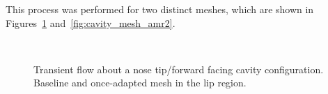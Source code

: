 This process was performed for two distinct meshes, which are shown in Figures~\ref{fig:cavity_mesh_amr1} and~\ref{fig:cavity_mesh_amr2}.
\begin{figure}[hbtp]
  \begin{center}
     \\
      \caption{Transient flow about a nose tip/forward facing cavity configuration.  Baseline and once-adapted mesh in the lip region.\label{fig:cavity_mesh_amr1}}
  \end{center}
\end{figure}

